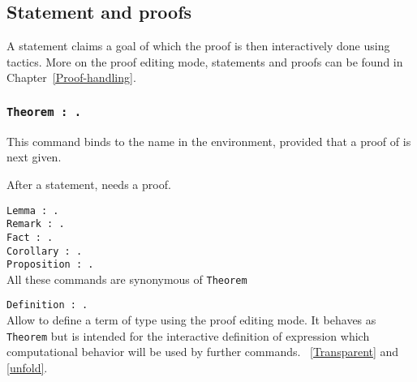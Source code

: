 \subsection{Statement and proofs}

A statement claims a goal of which the proof is then interactively done
using tactics. More on the proof editing mode, statements and proofs can be
found in Chapter~\ref{Proof-handling}.

\subsubsection{\tt Theorem {\ident} : {\type}.
}

This command binds {\type} to the name {\ident} in the
environment, provided that a proof of {\type} is next given.

After a statement, {\Coq} needs a proof.

\begin{Variants} 
\item {\tt Lemma {\ident} : {\type}.}\\ 
      {\tt Remark {\ident} : {\type}.}\\ 
      {\tt Fact {\ident} : {\type}.}\\ 
      {\tt Corollary {\ident} : {\type}.}\\ 
      {\tt Proposition {\ident} : {\type}.}\\ 
All these commands are synonymous of \texttt{Theorem}
\item {\tt Definition {\ident} : {\type}.} \\
Allow to define a term of type {\type} using the proof editing mode. It
behaves as {\tt Theorem} but is intended for the interactive
definition of expression which computational behavior will be used by
further commands. \SeeAlso~\ref{Transparent} and \ref{unfold}. 
\end{Variants}

